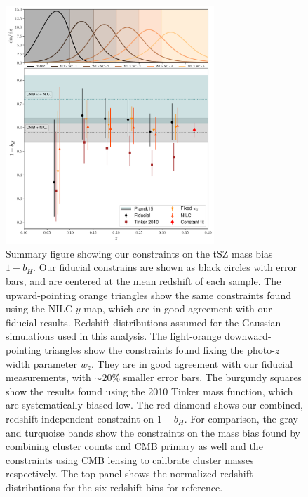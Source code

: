 \documentclass[useAMS,usenatbib]{mn2e}
\begin{document}
      \begin{figure}
        \centering
        \includegraphics[width=0.7\textwidth]{bhydro.pdf}
        \caption{Summary figure showing our constraints on the tSZ mass bias $1-b_H$. Our fiducial constrains are shown as black circles with error bars, and are centered at the mean redshift of each sample. The upward-pointing orange triangles show the same constraints found using the NILC $y$ map, which are in good agreement with our fiducial results. Redshift distributions assumed for the Gaussian simulations used in this analysis. The light-orange downward-pointing triangles show the constraints found fixing the photo-$z$ width parameter $w_z$. They are in good agreement with our fiducial measurements, with $\sim20\%$ smaller error bars. The burgundy squares show the results found using the 2010 Tinker mass function, which are systematically biased low. The red diamond shows our combined, redshift-independent constraint on $1-b_H$. For comparison, the gray and turquoise bands show the constraints on the mass bias found by combining cluster counts and CMB primary \citep{2016A&A...594A..24P} as well and the constraints using CMB lensing to calibrate cluster masses \citep{2019arXiv190407887Z} respectively. The top panel shows the normalized redshift distributions for the six redshift bins for reference.}
        \label{fig:bh}
      \end{figure}
\end{document}
